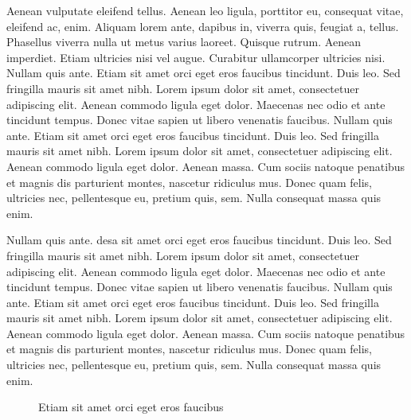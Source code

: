 Aenean vulputate eleifend tellus. Aenean leo ligula, porttitor eu, consequat vitae, eleifend ac, enim. Aliquam lorem ante, dapibus in, viverra quis, feugiat a, tellus. Phasellus viverra nulla ut metus varius laoreet. Quisque rutrum. Aenean imperdiet. Etiam ultricies nisi vel augue. Curabitur ullamcorper ultricies nisi. Nullam quis ante. Etiam sit amet orci eget eros faucibus tincidunt. Duis leo. Sed fringilla mauris sit amet nibh. Lorem ipsum dolor sit amet, consectetuer adipiscing elit. Aenean commodo ligula eget dolor. Maecenas nec odio et ante tincidunt tempus. Donec vitae sapien ut libero venenatis faucibus. Nullam quis ante. Etiam sit amet orci eget eros faucibus tincidunt. Duis leo. Sed fringilla mauris sit amet nibh. Lorem ipsum dolor sit amet, consectetuer adipiscing elit. Aenean commodo ligula eget dolor. Aenean massa. Cum sociis natoque penatibus et magnis dis parturient montes, nascetur ridiculus mus. Donec quam felis, ultricies nec, pellentesque eu, pretium quis, sem. Nulla consequat massa quis enim.

Nullam quis ante. \gls{desa} sit amet orci eget eros faucibus tincidunt. Duis leo. Sed fringilla mauris sit amet nibh. Lorem ipsum dolor sit amet, consectetuer adipiscing elit. Aenean commodo ligula eget dolor. Maecenas nec odio et ante tincidunt tempus. Donec vitae sapien ut libero venenatis faucibus. Nullam quis ante. Etiam sit amet orci eget eros faucibus tincidunt. Duis leo. Sed fringilla mauris sit amet nibh. Lorem ipsum dolor sit amet, consectetuer adipiscing elit. Aenean commodo ligula eget dolor. Aenean massa. Cum sociis natoque penatibus et magnis dis parturient montes, nascetur ridiculus mus. Donec quam felis, ultricies nec, pellentesque eu, pretium quis, sem. Nulla consequat massa quis enim.

\begin{figure}[H]
\begin{center}
\caption{Etiam sit amet orci eget eros faucibus}
\end{center}
\end{figure}

